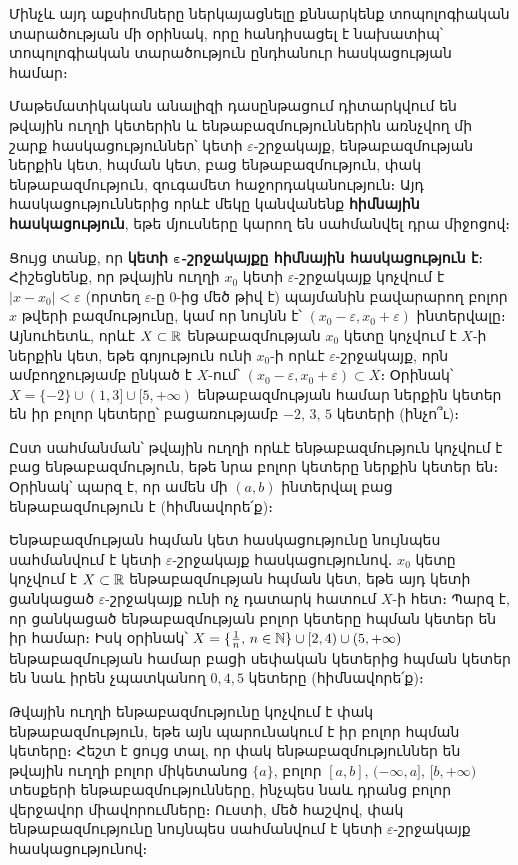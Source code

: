 \documentclass[./main.tex]{subfiles}
\begin{document}
\par Մինչև այդ աքսիոմները ներկայացնելը քննարկենք տոպոլոգիական տարածու\-թյան մի օրինակ, որը հանդիսացել է նախատիպ՝ տոպոլոգիական տարածություն ընդհանուր հասկացության համար։

\par Մաթեմատիկական անալիզի դասընթացում դիտարկվում են թվային ուղղի կե\-տե\-րին և ենթաբազ\-մություններին առնչվող մի շարք հասկացություններ՝ կետի $\varepsilon$-շրջակայք, ենթաբազմության ներքին կետ, հպման կետ, բաց ենթաբազմություն, փակ ենթաբազմություն, զուգամետ հաջորդականություն։ Այդ հասկացություննե\-րից որևէ մեկը կանվանենք \textbf{հիմնային հասկացություն}, եթե մյուսները կարող են սահ\-մանվել դրա միջոցով։

\par Ցույց տանք, որ \textbf{կետի $\boldsymbol{\varepsilon}$-շրջակայքը հիմնային հասկացություն է}։ Հիշեցնենք, որ թվային ուղղի $x_0$ կետի $\varepsilon$-շրջակայք կոչվում է $|x-x_0|<\varepsilon$ (որտեղ $\varepsilon$-ը 0-ից մեծ թիվ է) պայմանին բավարարող բոլոր $x$ թվերի բազմությունը, կամ որ նույնն է՝ ${(x_0-\varepsilon, x_0+\varepsilon)}$ ինտերվալը։ Այնուհետև, որևէ ${X \subset \mathbb{R}}$ ենթաբազմության $x_0$ կետը կոչվում է $X$-ի ներքին կետ, եթե գոյություն ունի $x_0$-ի որևէ $\varepsilon$-շրջակայք, որն ամբող\-ջությամբ ընկած է $X$-ում՝ $(x_0-\varepsilon,x_0+\varepsilon) \subset X$։ Օրինակ՝ $X=\{-2\} \cup (1,3] \cup [5,+\infty)$ ենթաբազմության համար ներքին կետեր են իր բոլոր կետերը՝ բացառությամբ $-2$, $3$, $5$ կետերի (ինչո՞ւ)։

\par Ըստ սահմանման՝ թվային ուղղի որևէ ենթաբազմություն կոչվում է բաց ենթա\-բազ\-մություն, եթե նրա բոլոր կետերը ներքին կետեր են։ Օրինակ՝ պարզ է, որ ամեն մի $(a,b)$ ինտերվալ բաց ենթաբազմություն է (հիմնավորե՛ք)։

\par Ենթաբազմության հպման կետ հասկացությունը նույնպես սահմանվում է կետի $\varepsilon$-շրջակայք հասկացությունով․ $x_0$ կետը կոչվում է $X \subset \mathbb{R}$ ենթաբազմության հպման կետ, եթե այդ կետի ցանկացած $\varepsilon$-շրջակայք ունի ոչ դատարկ հատում $X$-ի հետ։ Պարզ է, որ ցանկացած ենթաբազմության բոլոր կետերը հպման կետեր են իր համար։ Իսկ օրինակ՝ $X=\{\frac{1}{n},\, n \in \mathbb{N}\}\cup[2,4)\cup (5,+\infty)$ ենթաբազմության համար բացի սեփական կետերից հպման կետեր են նաև իրեն չպատկանող $0,4,5$ կետերը (հիմնավորե՛ք)։

\par Թվային ուղղի ենթաբազմությունը կոչվում է փակ ենթաբազմություն, եթե այն պարունակում է իր բոլոր հպման կետերը։ Հեշտ է ցույց տալ, որ փակ ենթա\-բազ\-մու\-թյուններ են թվային ուղղի բոլոր միկետանոց $\{a\}$, բոլոր $[a,b]$, $(-\infty,a]$, $[b,+\infty)$ տեսքերի ենթաբազմությունները, ինչպես նաև դրանց բոլոր վերջավոր միավորում\-ները։ Ուստի, մեծ հաշվով, փակ ենթաբազմությունը նույնպես սահմանվում է կետի $\varepsilon$-շրջակայք հասկացությունով։
\end{document}
